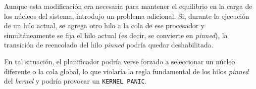 Aunque esta modificación era necesaria para mantener el equilibrio en la carga de los núcleos del sistema, introdujo un problema adicional. Si, durante la ejecución de un hilo actual, se agrega otro hilo a la cola de ese procesador y simultáneamente se fija el hilo actual (es decir, se convierte en \textit{pinned}), la transición de reencolado del hilo \textit{pinned} podría quedar deshabilitada.\par

En tal situación, el planificador podría verse forzado a seleccionar un núcleo diferente o la cola global, lo que violaría la regla fundamental de los hilos \textit{pinned} del \textit{kernel} y podría provocar un \texttt{KERNEL PANIC}.\par








